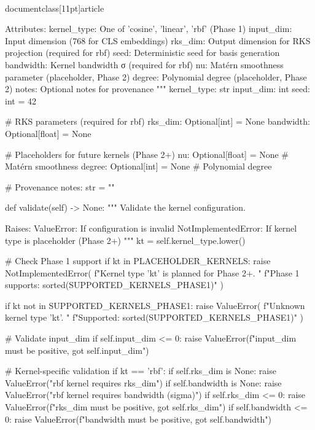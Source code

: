 \\documentclass[11pt]{article}
\begin{document}
\begin{CodeBlock}
    Attributes:
        kernel_type: One of 'cosine', 'linear', 'rbf' (Phase 1)
        input_dim: Input dimension (768 for CLS embeddings)
        rks_dim: Output dimension for RKS projection (required for rbf)
        seed: Deterministic seed for basis generation
        bandwidth: Kernel bandwidth σ (required for rbf)
        nu: Matérn smoothness parameter (placeholder, Phase 2)
        degree: Polynomial degree (placeholder, Phase 2)
        notes: Optional notes for provenance
    """
    kernel_type: str
    input_dim: int
    seed: int = 42
    
    # RKS parameters (required for rbf)
    rks_dim: Optional[int] = None
    bandwidth: Optional[float] = None
    
    # Placeholders for future kernels (Phase 2+)
    nu: Optional[float] = None          # Matérn smoothness
    degree: Optional[int] = None        # Polynomial degree
    
    # Provenance
    notes: str = ""
    
    def validate(self) -> None:
        """
        Validate the kernel configuration.
        
        Raises:
            ValueError: If configuration is invalid
            NotImplementedError: If kernel type is placeholder (Phase 2+)
        """
        kt = self.kernel_type.lower()
        
        # Check Phase 1 support
        if kt in PLACEHOLDER_KERNELS:
            raise NotImplementedError(
                f"Kernel type '{kt}' is planned for Phase 2+. "
                f"Phase 1 supports: {sorted(SUPPORTED_KERNELS_PHASE1)}"
            )
        
        if kt not in SUPPORTED_KERNELS_PHASE1:
            raise ValueError(
                f"Unknown kernel type '{kt}'. "
                f"Supported: {sorted(SUPPORTED_KERNELS_PHASE1)}"
            )
        
        # Validate input_dim
        if self.input_dim <= 0:
            raise ValueError(f"input_dim must be positive, got {self.input_dim}")
        
        # Kernel-specific validation
        if kt == 'rbf':
            if self.rks_dim is None:
                raise ValueError("rbf kernel requires rks_dim")
            if self.bandwidth is None:
                raise ValueError("rbf kernel requires bandwidth (sigma)")
            if self.rks_dim <= 0:
                raise ValueError(f"rks_dim must be positive, got {self.rks_dim}")
            if self.bandwidth <= 0:
                raise ValueError(f"bandwidth must be positive, got {self.bandwidth}")
        

\end{CodeBlock}
\end{document}
